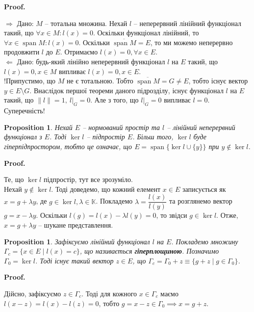 \documentclass[a4paper, 10pt]{article}
\makeatletter
\def\rightproof{$\boxed{\Rightarrow}$ }
\def\leftproof{$\boxed{\Leftarrow}$ }
\theoremstyle{theoremdd}
\theoremstyle{theoremdd}
\theoremstyle{theoremdd}
\theoremstyle{theoremdd}
\theoremstyle{theoremdd}
\newtheorem{proposition}[theorem]{Proposition}
\theoremstyle{theoremdd}
\theoremstyle{theoremdd}
\theoremstyle{theoremdd}
\renewenvironment{proof}[1][Proof.\\]{\par
\pushQED{\hfill \qed}%
\normalfont \topsep6\p@\@plus6\p@\relax
\trivlist
\item\relax
{\bfseries
#1\@addpunct{.}}\hspace\labelsep\ignorespaces
}{%
\popQED\endtrivlist\@endpefalse
}
\DeclareMathOperator{\linspan}{span}
\makeatother
\begin{document}
\begin{proof}
\rightproof Дано: $M$ -- тотальна множина. Нехай $l$ -- неперервний лінійний функціонал такий, що $\forall x \in M: l(x) = 0$. Оскільки функціонал лінійний, то $\forall x \in \linspan{M}: l(x) = 0$. Оскільки $\overline{\linspan{M}} = E$, то ми можемо неперервно продовжити $l$ до $E$. Отримаємо $l(x) = 0, \forall x \in E$.
\bigskip \\
\leftproof Дано: будь-який лінійно неперервний функціонал $l $ на $E$ такий, що $l(x) = 0, x \in M$ випливає $l(x) = 0, x \in E$.\\
!Припустимо, що $M$ не є тотальною. Тобто $\overline{\linspan{M}} = G \neq E$, тобто існує вектор $y \in E \setminus G$. Внаслідок першої теореми даного підрозділу, існує функціонал $l$ на $E$ такий, що $\|l\| = 1,\ l|_G = 0$. Але з того, що $l|_G = 0$ випливає $l = 0$. Суперечність!
\end{proof}

\begin{proposition}
Нехай $E$ -- нормований простір та $l$ -- лінійний неперервний функціонал з $E$. Тоді $\ker l$ -- підпростір $E$. Більш того, $\ker l$ буде гіперпідпростором, тобто це означає, що $E = \linspan\{\ker l \cup \{y\}\}$ при $y \notin \ker l$.
\end{proposition}

\begin{proof}
Те, що $\ker l$ підпростір, тут все зрозуміло.\\
Нехай $y \notin \ker l$. Тоді доведемо, що кожний елемент $x \in E$ записується як $x = g + \lambda y$, де $g \in \ker l, \lambda \in \mathbb{K}$. Покладемо $\lambda = \dfrac{l(x)}{l(y)}$ та розглянемо вектор $g = x - \lambda y$. Оскільки $l(g) = l(x) - \lambda l(y) = 0$, то звідси $g \in \ker l$. Отже, $x = g + \lambda y$ -- шукане представлення.
\end{proof}

\begin{proposition}
Зафіксуємо лінійний функціонал $l$ на $E$. Покладемо множину $\Gamma_c = \{x \in E \mid l(x) = c\}$, що називається \textbf{гіперплощиною}. Позначимо $\Gamma_0 = \ker l$. Тоді існує такий вектор $z \in E$, що $\Gamma_c = \Gamma_0 + z \equiv \{g + z \mid g \in \Gamma_0 \}$.
\end{proposition}

\begin{proof}
Дійсно, зафіксуємо $z \in \Gamma_c$. Тоді для кожного $x \in \Gamma_c$ маємо $l(x-z) = l(x) - l(z) = 0$, тобто $g = x-z \in \Gamma_0 \implies x = g +z$.
\end{proof}
\end{document}
